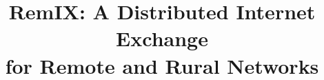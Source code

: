 \documentclass{sig-alternate-10pt}
\begin{document}






%

\title{RemIX: A Distributed Internet Exchange\\for Remote and Rural Networks
}

%
%
%
%
%
\end{document}
